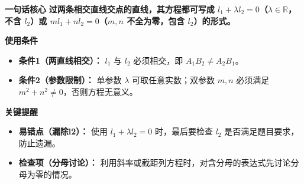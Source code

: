 \begin{summarybox}
	\textbf{\textcolor{CSummary}{一句话核心}}
	\textbf{过两条相交直线交点的直线，其方程都可写成 $l_1+\lambda l_2=0$（$\lambda\in\mathbb{R}$，不含 $l_2$）或 $m l_1+n l_2=0$（$m,n$ 不全为零，包含 $l_2$）的形式。}

	\medskip
	\textbf{\textcolor{CSummary}{使用条件}}
	\begin{itemize}[leftmargin=*, itemsep=0.5em, topsep=0.4em]
		\item \textbf{条件1（两直线相交）：} $l_1$ 与 $l_2$ 必须相交，即 $A_1B_2\neq A_2B_1$。
		\item \textbf{条件2（参数限制）：} 单参数 $\lambda$ 可取任意实数；双参数 $m,n$ 必须满足 $m^2+n^2\neq0$，否则方程无意义。
	\end{itemize}

	\medskip
	\textbf{\textcolor{CSummary}{关键提醒}}
	\begin{itemize}[leftmargin=*, itemsep=0.5em, topsep=0.4em]
		\item \textbf{易错点（漏除l2）：} 使用 $l_1+\lambda l_2=0$ 时，最后要检查 $l_2$ 是否满足题目要求，防止遗漏。
		\item \textbf{检查项（分母讨论）：} 利用斜率或截距列方程时，对含分母的表达式先讨论分母为零的情况。
	\end{itemize}

\end{summarybox}
